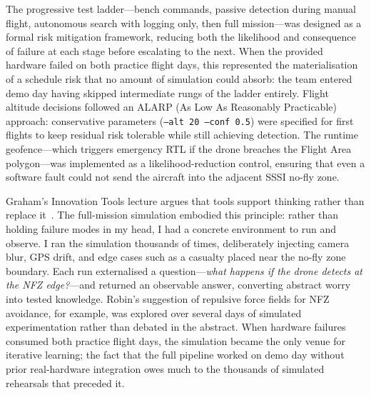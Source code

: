 
The progressive test ladder---bench commands, passive detection during manual flight,
autonomous search with logging only, then full mission---was designed as a formal risk
mitigation framework, reducing both the likelihood and consequence of failure at each
stage before escalating to the next.
When the provided hardware failed on both practice flight days, this represented the
materialisation of a schedule risk that no amount of simulation could absorb: the team
entered demo day having skipped intermediate rungs of the ladder entirely.
Flight altitude decisions followed an ALARP (As Low As Reasonably Practicable) approach:
conservative parameters (\texttt{--alt 20 --conf 0.5}) were specified for first flights
to keep residual risk tolerable while still achieving detection.
The runtime geofence---which triggers emergency RTL if the drone breaches the Flight Area
polygon---was implemented as a likelihood-reduction control, ensuring that even a software
fault could not send the aircraft into the adjacent SSSI no-fly zone.


Graham's Innovation Tools lecture argues that tools support thinking rather than replace
it~\cite{graham_innovation}.
The full-mission simulation embodied this principle: rather than holding failure modes
in my head, I had a concrete environment to run and observe.
I ran the simulation thousands of times, deliberately injecting camera blur, GPS drift,
and edge cases such as a casualty placed near the no-fly zone boundary.
Each run externalised a question---\emph{what happens if the drone detects at the NFZ
edge?}---and returned an observable answer, converting abstract worry into tested knowledge.
Robin's suggestion of repulsive force fields for NFZ avoidance, for example, was explored
over several days of simulated experimentation rather than debated in the abstract.
When hardware failures consumed both practice flight days, the simulation became the
only venue for iterative learning; the fact that the full pipeline worked on demo day
without prior real-hardware integration owes much to the thousands of simulated rehearsals
that preceded it.
